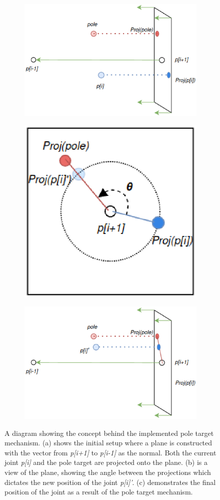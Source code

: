 \begin{figure}[!h]
    \centering
    \captionsetup{justification=centering}
    \begin{subfigure}{\textwidth}
        \centering
        \includegraphics[width=0.6\linewidth]{grafika/pole_start.eps}
        \label{fig:pole_start}
    \end{subfigure}
    \begin{subfigure}{\textwidth}
        \centering
        \includegraphics[width=0.4\linewidth]{grafika/pole_projection.eps}
        \label{fig:pole_projection}
    \end{subfigure}
    \begin{subfigure}{\textwidth}
        \centering
        \includegraphics[width=0.6\linewidth]{grafika/pole_end.eps}
        \label{fig:pole_end}
    \end{subfigure}
    \caption{A diagram showing the concept behind the implemented pole target
    mechanism. (a) shows the initial setup where a plane is constructed with the
    vector from \textit{p[i+1]} to \textit{p[i-1]} as the normal. Both the
    current joint \textit{p[i]} and the pole target are projected onto the
    plane. (b) is a view of the plane, showing the angle between the
    projections which dictates the new position of the joint \textit{p[i]'}. (c)
    demonstrates the final position of the joint as a result of the pole target
    mechanism.}
    \label{fig:pole_diagram}
\end{figure}

